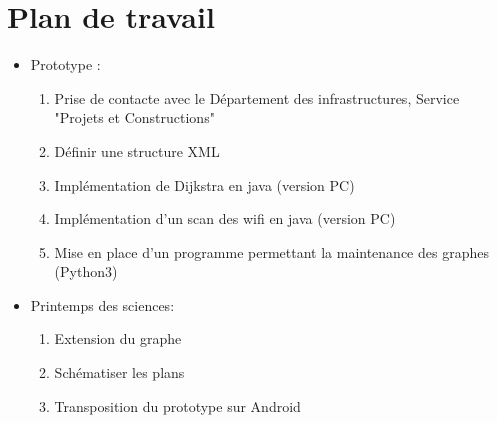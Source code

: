 \documentclass[a4paper,11pt]{article}
\begin{document}
\section{Plan de travail}
  \begin{itemize}
    \item Prototype :
      \begin{enumerate}
        \item Prise de contacte avec le Département des infrastructures, Service "Projets et Constructions"
        \item Définir une structure XML
        \item Implémentation de Dijkstra en java (version PC)
        \item Implémentation d'un scan des wifi en java (version PC)
        \item Mise en place d'un programme permettant la maintenance des graphes (Python3)
      \end{enumerate}
    \item Printemps des sciences:
      \begin{enumerate}
        \item Extension du graphe
        \item Schématiser les plans
        \item Transposition du prototype sur Android
      \end{enumerate}
  \end{itemize}
\end{document}
